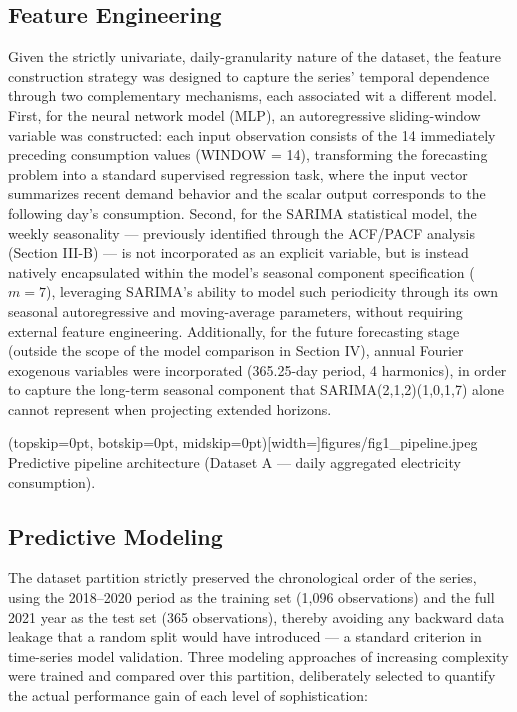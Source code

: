 \documentclass{ieeeaccess}
\begin{document}
\subsection{Feature Engineering}
\label{sec:feature engineering}
Given the strictly univariate, daily-granularity nature of the dataset, the feature construction strategy was designed to capture the series' temporal dependence through two complementary mechanisms, each associated wit a different model. First, for the neural network model (MLP), an autoregressive sliding-window variable was constructed: each input observation consists of the 14 immediately preceding consumption values (WINDOW = 14), transforming the forecasting problem into a standard supervised regression task, where the input vector summarizes recent demand behavior and the scalar output corresponds to the following day's consumption. Second, for the SARIMA statistical model, the weekly seasonality --- previously identified through the ACF/PACF analysis (Section III-B) --- is not incorporated as an explicit variable, but is instead natively encapsulated within the model's seasonal component specification ($m=7$), leveraging SARIMA's ability to model such periodicity through its own seasonal autoregressive and moving-average parameters, without requiring external feature engineering. Additionally, for the future forecasting stage (outside the scope of the model comparison in Section IV), annual Fourier exogenous variables were incorporated (365.25-day period, 4 harmonics), in order to capture the long-term seasonal component that SARIMA(2,1,2)(1,0,1,7) alone cannot represent when projecting extended horizons.

\Figure[t!](topskip=0pt, botskip=0pt, midskip=0pt)[width=\textwidth]{figures/fig1_pipeline.jpeg}
{Predictive pipeline architecture (Dataset A --- daily aggregated electricity consumption).\label{fig1_pipeline}}

\subsection{Predictive Modeling}
The dataset partition strictly preserved the chronological order of the series, using the 2018--2020 period as the training set (1,096 observations) and the full 2021 year as the test set (365 observations), thereby avoiding any backward data leakage that a random split would have introduced --- a standard criterion in time-series model validation. Three modeling approaches of increasing complexity were trained and compared over this partition, deliberately selected to quantify the actual performance gain of each level of sophistication:
\end{document}
